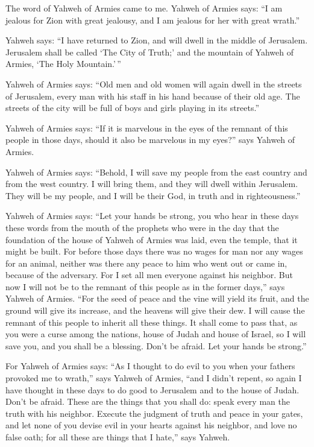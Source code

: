  The word of Yahweh of Armies came to me. 
Yahweh of Armies says: ``I am jealous for Zion with great jealousy, and
I am jealous for her with great wrath.''

 Yahweh says: ``I have returned to Zion, and will dwell in
the middle of Jerusalem. Jerusalem shall be called `The City of Truth;'
and the mountain of Yahweh of Armies, `The Holy Mountain.'\,''

 Yahweh of Armies says: ``Old men and old women will again
dwell in the streets of Jerusalem, every man with his staff in his hand
because of their old age.  The streets of the city will be
full of boys and girls playing in its streets.''

 Yahweh of Armies says: ``If it is marvelous in the eyes of
the remnant of this people in those days, should it also be marvelous in
my eyes?'' says Yahweh of Armies.

 Yahweh of Armies says: ``Behold, I will save my people from
the east country and from the west country.  I will bring
them, and they will dwell within Jerusalem. They will be my people, and
I will be their God, in truth and in righteousness.''

 Yahweh of Armies says: ``Let your hands be strong, you who
hear in these days these words from the mouth of the prophets who were
in the day that the foundation of the house of Yahweh of Armies was
laid, even the temple, that it might be built.  For before
those days there was no wages for man nor any wages for an animal,
neither was there any peace to him who went out or came in, because of
the adversary. For I set all men everyone against his neighbor.
 But now I will not be to the remnant of this people as in
the former days,'' says Yahweh of Armies.  ``For the seed
of peace and the vine will yield its fruit, and the ground will give its
increase, and the heavens will give their dew. I will cause the remnant
of this people to inherit all these things.  It shall come
to pass that, as you were a curse among the nations, house of Judah and
house of Israel, so I will save you, and you shall be a blessing. Don't
be afraid. Let your hands be strong.''

 For Yahweh of Armies says: ``As I thought to do evil to
you when your fathers provoked me to wrath,'' says Yahweh of Armies,
``and I didn't repent,  so again I have thought in these
days to do good to Jerusalem and to the house of Judah. Don't be afraid.
 These are the things that you shall do: speak every man
the truth with his neighbor. Execute the judgment of truth and peace in
your gates,  and let none of you devise evil in your hearts
against his neighbor, and love no false oath; for all these are things
that I hate,'' says Yahweh.

